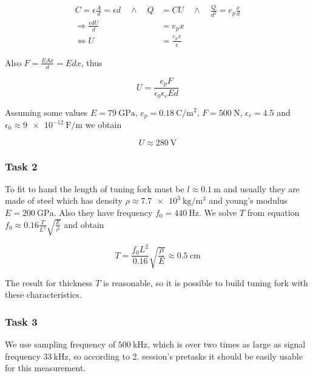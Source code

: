 \documentclass[12pt]{article}
\begin{document}
\begin{align*}
C = \epsilon \frac{A}{d} = \epsilon d \quad \wedge \quad Q &= CU \quad \wedge \quad \frac{Q}{d^2} = e_p \frac{x}{d} \\
\Rightarrow \frac{\epsilon d U}{d} &= e_p x \\
\Leftrightarrow U &= \frac{e_p x}{\epsilon}
\end{align*}

Also $F = \frac{EAx}{d} = Edx$, thus

\begin{equation*}
U = \frac{e_p F}{\epsilon_0 \epsilon_r E d}
\end{equation*}

Assuming some values $E = \SI{79}{\giga\pascal}$, $e_p = \SI{0.18}{\coulomb\per\square\meter}$, $F = \SI{500}{\newton}$, $\epsilon_r = 4.5$ and $\epsilon_0 \approx \SI{9e-12}{\farad\per\meter}$ we obtain

\begin{equation*}
U \approx \SI{280}{\volt}
\end{equation*}


\subsubsection{Task 2}

To fit to hand the length of tuning fork must be $l \approx \SI{0.1}{\meter}$ and usually they are made of steel which has density $\rho \approx \SI{7.7e3}{\kilo\gram\per\cubic\meter}$ and young's modulus $E = \SI{200}{\giga\pascal}$. Also they have frequency $f_0 = \SI{440}{\hertz}$. We solve $T$ from equation $f_0 \approx 0.16 \frac{T}{L^2} \sqrt{\frac{E}{\rho}}$ and obtain

\begin{equation*}
T = \frac{f_0 L^2}{0.16} \sqrt{\frac{\rho}{E}} \approx \SI{0.5}{\centi\meter}
\end{equation*}

The result for thickness $T$ is reasonable, so it is possible to build tuning fork with these characteristics.


\subsubsection{Task 3}

We use sampling frequency of $\SI{500}{\kilo\hertz}$, which is over two times as large as signal frequency $\SI{33}{\kilo\hertz}$, so according to 2. session's pretasks it should be easily usable for this measurement.
\end{document}
